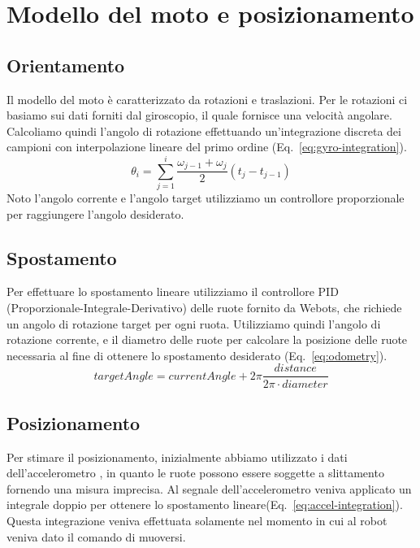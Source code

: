 \documentclass[a4paper]{article}
\begin{document}
	\section{Modello del moto e posizionamento}\label{sec:Modello-del-moto-e-posizionamento} 
	\subsection{Orientamento}\label{subsec:Orientamento}
	Il modello del moto è caratterizzato da rotazioni e traslazioni. Per le
	rotazioni ci basiamo sui dati forniti dal giroscopio, il quale fornisce una
	velocità angolare. Calcoliamo quindi l'angolo di rotazione effettuando
	un'integrazione discreta dei campioni con interpolazione lineare del primo
	ordine (Eq.~\ref{eq:gyro-integration}).  
	\begin{equation}\label{eq:gyro-integration}
		\theta_i = \sum_{j=1}^i \frac{\omega _{j-1}+\omega _j}{2} \left( t_j-t_{j-1} \right) 
	\end{equation}
	Noto l'angolo corrente e l'angolo target utilizziamo un controllore
	proporzionale per raggiungere l'angolo desiderato.
	
	\subsection{Spostamento}\label{subsec:Spostamento}
	Per effettuare lo spostamento lineare utilizziamo il controllore PID
	(Proporzionale-Integrale-Derivativo) delle ruote fornito da Webots, che
	richiede un angolo di rotazione target per ogni ruota. Utilizziamo quindi
	l'angolo di rotazione corrente, e il diametro delle ruote per calcolare la
	posizione delle ruote necessaria al fine di ottenere lo spostamento
	desiderato (Eq.~\ref{eq:odometry}).
	\begin{equation}\label{eq:odometry}
	targetAngle =
	currentAngle+2\pi\frac    {distance}
					{2\pi \cdot diameter}
	\end{equation}
	
	\subsection{Posizionamento}\label{subsec:Posizionamento}
	Per stimare il posizionamento, inizialmente abbiamo utilizzato i dati dell'accelerometro
	\cite{positioning}, in quanto le ruote possono essere soggette a
	slittamento fornendo una misura imprecisa. Al segnale dell'accelerometro
	veniva applicato un integrale doppio per ottenere lo spostamento
	lineare(Eq.~\ref{eq:accel-integration}). Questa integrazione veniva effettuata solamente nel momento in cui al robot veniva dato il comando di muoversi.
\end{document}

